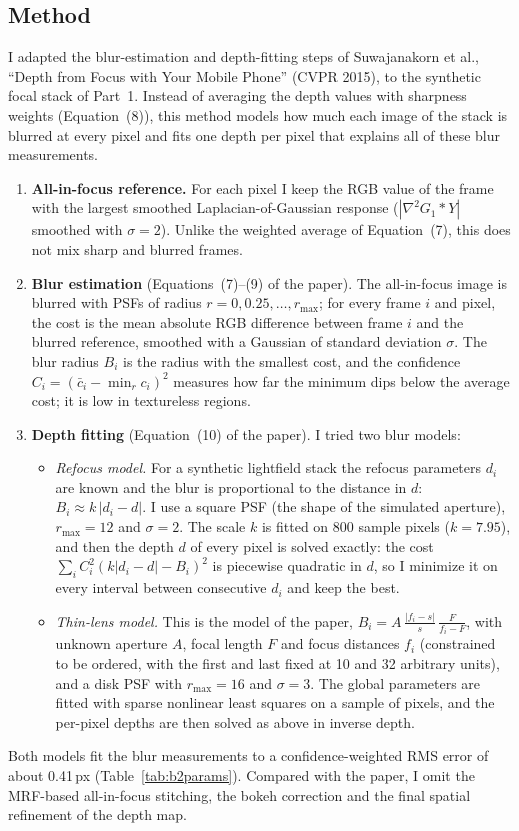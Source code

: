 \documentclass[11pt]{article}
\begin{document}
\subsection*{Method}
I adapted the blur-estimation and depth-fitting steps of Suwajanakorn et al., ``Depth from Focus with Your Mobile Phone'' (CVPR 2015), to the synthetic focal stack of Part~1. Instead of averaging the depth values with sharpness weights (Equation~(8)), this method models how much each image of the stack is blurred at every pixel and fits one depth per pixel that explains all of these blur measurements.
\begin{enumerate}\setlength{\itemsep}{2pt}
\item \textbf{All-in-focus reference.} For each pixel I keep the RGB value of the frame with the largest smoothed Laplacian-of-Gaussian response ($|\nabla^2 G_1 * Y|$ smoothed with $\sigma=2$). Unlike the weighted average of Equation~(7), this does not mix sharp and blurred frames.
\item \textbf{Blur estimation} (Equations~(7)--(9) of the paper). The all-in-focus image is blurred with PSFs of radius $r=0,0.25,\dots,r_{\max}$; for every frame $i$ and pixel, the cost is the mean absolute RGB difference between frame $i$ and the blurred reference, smoothed with a Gaussian of standard deviation $\sigma$. The blur radius $B_i$ is the radius with the smallest cost, and the confidence $C_i=(\bar c_i-\min_r c_i)^2$ measures how far the minimum dips below the average cost; it is low in textureless regions.
\item \textbf{Depth fitting} (Equation~(10) of the paper). I tried two blur models:
\begin{itemize}\setlength{\itemsep}{0pt}
\item \emph{Refocus model.} For a synthetic lightfield stack the refocus parameters $d_i$ are known and the blur is proportional to the distance in $d$: $B_i\approx k\,|d_i-d|$. I use a square PSF (the shape of the simulated aperture), $r_{\max}=12$ and $\sigma=2$. The scale $k$ is fitted on 800 sample pixels ($k=7.95$), and then the depth $d$ of every pixel is solved exactly: the cost $\sum_i C_i^2(k|d_i-d|-B_i)^2$ is piecewise quadratic in $d$, so I minimize it on every interval between consecutive $d_i$ and keep the best.
\item \emph{Thin-lens model.} This is the model of the paper, $B_i=A\,\frac{|f_i-s|}{s}\,\frac{F}{f_i-F}$, with unknown aperture $A$, focal length $F$ and focus distances $f_i$ (constrained to be ordered, with the first and last fixed at 10 and 32 arbitrary units), and a disk PSF with $r_{\max}=16$ and $\sigma=3$. The global parameters are fitted with sparse nonlinear least squares on a sample of pixels, and the per-pixel depths are then solved as above in inverse depth.
\end{itemize}
\end{enumerate}
Both models fit the blur measurements to a confidence-weighted RMS error of about 0.41\,px (Table~\ref{tab:b2params}). Compared with the paper, I omit the MRF-based all-in-focus stitching, the bokeh correction and the final spatial refinement of the depth map.
\end{document}
